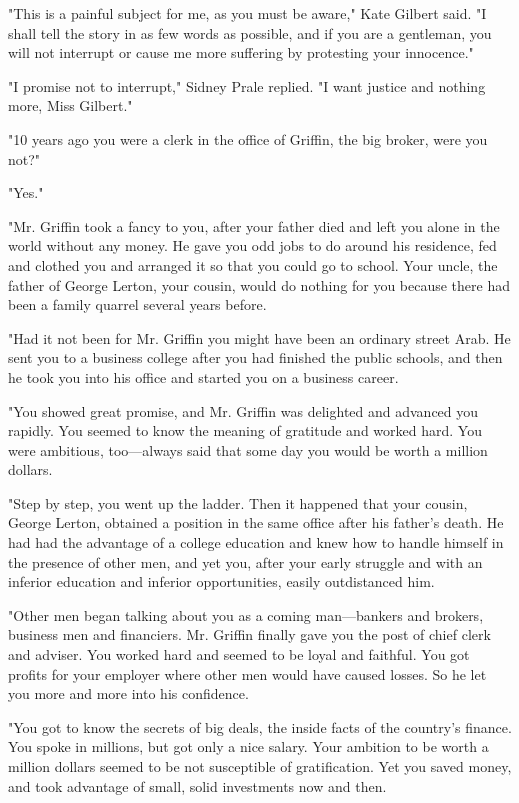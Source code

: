 \documentclass{novel}
\begin{document}
"This is a painful subject for me, as you must be aware," Kate Gilbert said. "I shall tell the story in as few words as possible, and if you are a gentleman, you will not interrupt or cause me more suffering by protesting your innocence."

"I promise not to interrupt," Sidney Prale replied. "I want justice and nothing more, Miss Gilbert."

"10 years ago you were a clerk in the office of Griffin, the big broker, were you not?"

"Yes."

"Mr. Griffin took a fancy to you, after your father died and left you alone in the world without any money. He gave you odd jobs to do around his residence, fed and clothed you and arranged it so that you could go to school. Your uncle, the father of George Lerton, your cousin, would do nothing for you because there had been a family quarrel several years before.

"Had it not been for Mr. Griffin you might have been an ordinary street Arab. He sent you to a business college after you had finished the public schools, and then he took you into his office and started you on a business career.

"You showed great promise, and Mr. Griffin was delighted and advanced you rapidly. You seemed to know the meaning of gratitude and worked hard. You were ambitious, too---always said that some day you would be worth a million dollars.

"Step by step, you went up the ladder. Then it happened that your cousin, George Lerton, obtained a position in the same office after his father's death. He had had the advantage of a college education and knew how to handle himself in the presence of other men, and yet you, after your early struggle and with an inferior education and inferior opportunities, easily outdistanced him.

"Other men began talking about you as a coming man---bankers and brokers, business men and financiers. Mr. Griffin finally gave you the post of chief clerk and adviser. You worked hard and seemed to be loyal and faithful. You got profits for your employer where other men would have caused losses. So he let you more and more into his confidence.

"You got to know the secrets of big deals, the inside facts of the country's finance. You spoke in millions, but got only a nice salary. Your ambition to be worth a million dollars seemed to be not susceptible of gratification. Yet you saved money, and took advantage of small, solid investments now and then.
\end{document}

